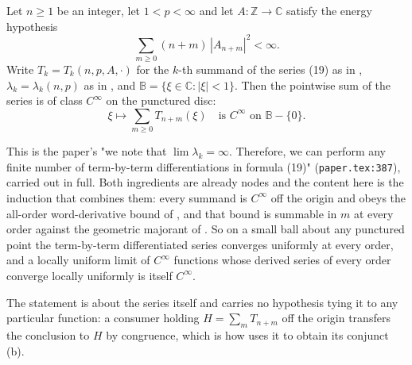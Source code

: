 \begin{helper}
Let $n\ge1$ be an integer, let $1<p<\infty$ and let
$A\colon\mathbb{Z}\to\mathbb{C}$ satisfy the energy hypothesis
\[
  \sum_{m\ge0}(n+m)\,|A_{n+m}|^{2}<\infty .
\]
Write $T_k=T_k(n,p,A,\cdot)$ for the $k$-th summand of the series (19) as in
, $\lambda_k=\lambda_k(n,p)$ as in , and
$\mathbb{B}=\{\xi\in\mathbb{C}:|\xi|<1\}$.  Then the pointwise sum of the
series is of class $C^\infty$ on the punctured disc:
\[
  \xi\longmapsto\sum_{m\ge0}T_{n+m}(\xi)
  \quad\text{is }C^\infty\text{ on }\mathbb{B}-\{0\}.
\]

This is the paper's "we note that $\lim\lambda_k=\infty$.  Therefore, we can
perform any finite number of term-by-term differentiations in formula (19)"
(\texttt{paper.tex:387}), carried out in full.  Both ingredients are already
nodes and the content here is the induction that combines them: every summand
is $C^\infty$ off the origin and obeys the all-order word-derivative bound of
, and that bound is summable in $m$ at every
order against the geometric majorant of
.  So on a small ball about any punctured
point the term-by-term differentiated series converges uniformly at every
order, and a locally uniform limit of $C^\infty$ functions whose derived series
of every order converge locally uniformly is itself $C^\infty$.

The statement is about the series itself and carries no hypothesis tying it to
any particular function: a consumer holding $H=\sum_m T_{n+m}$ off the origin
transfers the conclusion to $H$ by congruence, which is how
 uses it to obtain its conjunct (b).
\end{helper}
